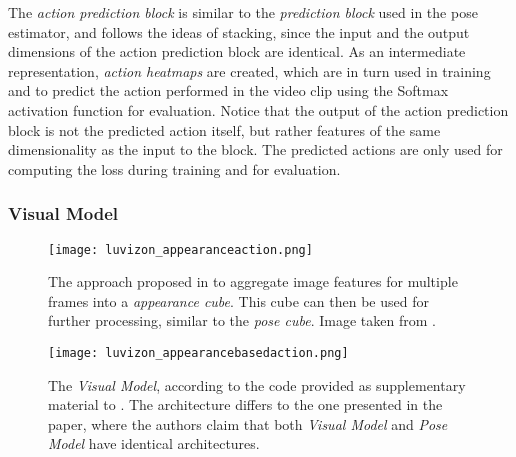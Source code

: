The \textit{action prediction block} is similar to the \textit{prediction block} used in the pose estimator, and follows the ideas of stacking, since the input and the output dimensions of the action prediction block are identical.
As an intermediate representation, \textit{action heatmaps} are created, which are in turn used in training and to predict the action performed in the video clip using the Softmax activation function for evaluation.
Notice that the output of the action prediction block is not the predicted action itself, but rather features of the same dimensionality as the input to the block.
The predicted actions are only used for computing the loss during training and for evaluation.

\subsubsection{Visual Model}
\label{sec:deephar_visualmodel}
\begin{figure}[htb!]
    \centering
    \texttt{[image: luvizon\_appearanceaction.png]}
    \caption{The approach proposed in \cite{luvizon_2d/3d_2018} to aggregate image features for multiple frames into a \textit{appearance cube}. This cube can then be used for further processing, similar to the \textit{pose cube}. Image taken from \cite{luvizon_2d/3d_2018}.}
    \label{fig:luvizon_appearanceaction}
\end{figure}

\begin{figure}[htb!]
    \centering
    \texttt{[image: luvizon\_appearancebasedaction.png]}
    \caption{The \textit{Visual Model}, according to the code provided as supplementary material to \cite{luvizon_2d/3d_2018}. The architecture differs to the one presented in the paper, where the authors claim that both \textit{Visual Model} and \textit{Pose Model} have identical architectures.}
    \label{fig:luvizon_appearancbasedeaction}
\end{figure}


